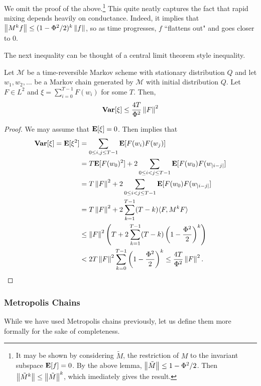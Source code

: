 We omit the proof of the above.\footnote{It may be shown by considering $\tilde{M}$, the restriction of $M$ to the invariant subspace $\textbf{E}[f]=0$. By the above lemma, $\left\lVert\tilde{M}\right\rVert\leq 1-\Phi^2/2$. Then $\left\lVert\tilde{M}^k\right\rVert \leq \left\lVert\tilde{M}\right\rVert^k$, which imediately gives the result.} This quite neatly captures the fact that rapid mixing depends heavily on conductance. Indeed, it implies that $\left\lVert M^k f\right\rVert \leq (1-\Phi^2/2)^k \left\lVert f\right\rVert$, so as time progresses, $f$ ``flattens out" and goes closer to $0$.

The next inequality can be thought of a central limit theorem style inequality.

\begin{theorem}
	\label{bounding variance}
	Let $\mathcal{M}$ be a time-reversible Markov scheme with stationary distribution $Q$ and let $w_1,w_2,\ldots$ be a Markov chain generated by $\mathcal{M}$ with initial distribution $Q$. Let $F\in L^2$ and $\xi = \sum_{i=0}^{T-1}F(w_i)$ for some $T$. Then,
	\[ \operatorname{\textbf{Var}}[\xi] \leq \frac{4T}{\Phi^2}\left\lVert F\right\rVert^2 \]
\end{theorem}
\begin{proof}
	We may assume that $\textbf{E}[\xi] = 0$. Then  implies that
	\begin{align*}
		\operatorname{\textbf{Var}}[\xi] = \textbf{E}[\xi^2] &= \sum_{0\leq i,j\leq T-1} \textbf{E}[F(w_i)F(w_j)] \\
			&= T\textbf{E}[F(w_0)^2] + 2 \sum_{0\leq i<j\leq T-1} \textbf{E}[F(w_0)F(w_{|i-j|}] \\
			&= T\left\lVert F\right\rVert^2 + 2 \sum_{0\leq i<j\leq T-1} \textbf{E}[F(w_0)F(w_{|i-j|}] \\
			&= T\left\lVert F\right\rVert^2 + 2 \sum_{k=1}^{T-1} (T-k) \langle F,M^{k}F\rangle \\
			&\leq \left\lVert F\right\rVert^2 \left(T + 2 \sum_{k=1}^{T-1} (T-k)\left(1-\frac{\Phi^2}{2}\right)^k\right) \\
			&< 2T\left\lVert F\right\rVert^2 \sum_{k=0}^{T-1} \left(1-\frac{\Phi^2}{2}\right)^k \leq \frac{4T}{\Phi^2} \left\lVert F\right\rVert^2.
	\end{align*}
\end{proof}

\subsubsection{Metropolis Chains}

While we have used Metropolis chains previously, let us define them more formally for the sake of completeness.

